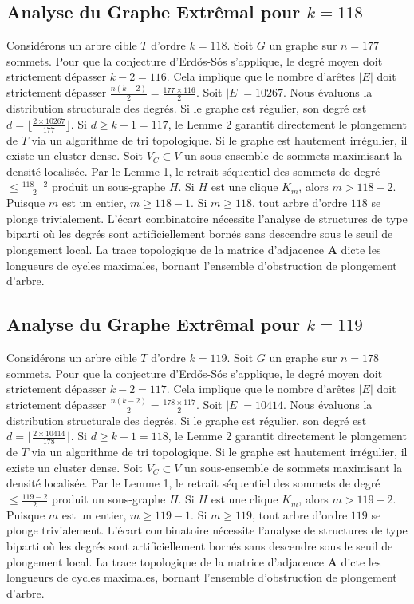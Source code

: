 \documentclass[11pt,a4paper]{article}
\begin{document}
\subsection{Analyse du Graphe Extr\^emal pour $k=118$}
Consid\'erons un arbre cible $T$ d'ordre $k=118$.
Soit $G$ un graphe sur $n=177$ sommets.
Pour que la conjecture d'Erd\H{o}s-S\'os s'applique, le degr\'e moyen doit strictement d\'epasser $k-2 = 116$.
Cela implique que le nombre d'ar\^etes $|E|$ doit strictement d\'epasser $\frac{n(k-2)}{2} = \frac{177 \times 116}{2}$.
Soit $|E| = 10267$.
Nous \'evaluons la distribution structurale des degr\'es. Si le graphe est r\'egulier, son degr\'e est $d = \lfloor \frac{2 \times 10267}{177} \rfloor$.
Si $d \geq k-1 = 117$, le Lemme 2 garantit directement le plongement de $T$ via un algorithme de tri topologique.
Si le graphe est hautement irr\'egulier, il existe un cluster dense. Soit $V_C \subset V$ un sous-ensemble de sommets maximisant la densit\'e localis\'ee.
Par le Lemme 1, le retrait s\'equentiel des sommets de degr\'e $\leq \frac{118-2}{2}$ produit un sous-graphe $H$.
Si $H$ est une clique $K_{m}$, alors $m > 118-2$. Puisque $m$ est un entier, $m \geq 118-1$. Si $m \geq 118$, tout arbre d'ordre $118$ se plonge trivialement.
L'\'ecart combinatoire n\'ecessite l'analyse de structures de type biparti o\`u les degr\'es sont artificiellement born\'es sans descendre sous le seuil de plongement local. La trace topologique de la matrice d'adjacence $\mathbf{A}$ dicte les longueurs de cycles maximales, bornant l'ensemble d'obstruction de plongement d'arbre.


\subsection{Analyse du Graphe Extr\^emal pour $k=119$}
Consid\'erons un arbre cible $T$ d'ordre $k=119$.
Soit $G$ un graphe sur $n=178$ sommets.
Pour que la conjecture d'Erd\H{o}s-S\'os s'applique, le degr\'e moyen doit strictement d\'epasser $k-2 = 117$.
Cela implique que le nombre d'ar\^etes $|E|$ doit strictement d\'epasser $\frac{n(k-2)}{2} = \frac{178 \times 117}{2}$.
Soit $|E| = 10414$.
Nous \'evaluons la distribution structurale des degr\'es. Si le graphe est r\'egulier, son degr\'e est $d = \lfloor \frac{2 \times 10414}{178} \rfloor$.
Si $d \geq k-1 = 118$, le Lemme 2 garantit directement le plongement de $T$ via un algorithme de tri topologique.
Si le graphe est hautement irr\'egulier, il existe un cluster dense. Soit $V_C \subset V$ un sous-ensemble de sommets maximisant la densit\'e localis\'ee.
Par le Lemme 1, le retrait s\'equentiel des sommets de degr\'e $\leq \frac{119-2}{2}$ produit un sous-graphe $H$.
Si $H$ est une clique $K_{m}$, alors $m > 119-2$. Puisque $m$ est un entier, $m \geq 119-1$. Si $m \geq 119$, tout arbre d'ordre $119$ se plonge trivialement.
L'\'ecart combinatoire n\'ecessite l'analyse de structures de type biparti o\`u les degr\'es sont artificiellement born\'es sans descendre sous le seuil de plongement local. La trace topologique de la matrice d'adjacence $\mathbf{A}$ dicte les longueurs de cycles maximales, bornant l'ensemble d'obstruction de plongement d'arbre.
\end{document}
